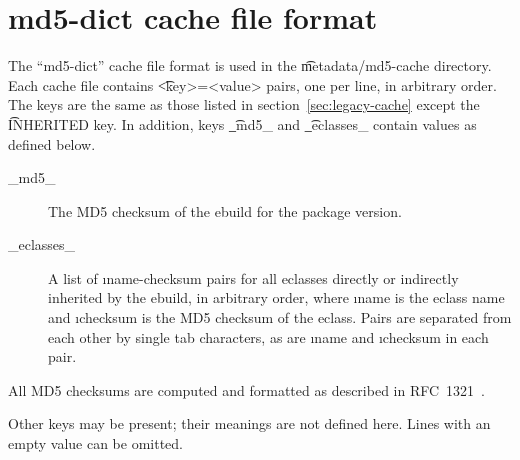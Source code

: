 \section{md5-dict cache file format}

The ``md5-dict'' cache file format is used in the \t{metadata/md5-cache} directory. Each cache file
contains \t{<key>=<value>} pairs, one per line, in arbitrary order. The keys are the same as those
listed in section~\ref{sec:legacy-cache} except the \t{INHERITED} key. In addition, keys \t{_md5_}
and \t{_eclasses_} contain values as defined below.

\begin{description}
\item[_md5_] The MD5 checksum of the ebuild for the package version.

\item[_eclasses_] A list of \i{name-checksum} pairs for all eclasses directly or indirectly
inherited by the ebuild, in arbitrary order, where \i{name} is the eclass name and \i{checksum}
is the MD5 checksum of the eclass. Pairs are separated from each other by single tab characters,
as are \i{name} and \i{checksum} in each pair.
\end{description}

All MD5 checksums are computed and formatted as described in RFC~1321~\cite{rfc1321}.

Other keys may be present; their meanings are not defined here. Lines with an empty value can be
omitted.


